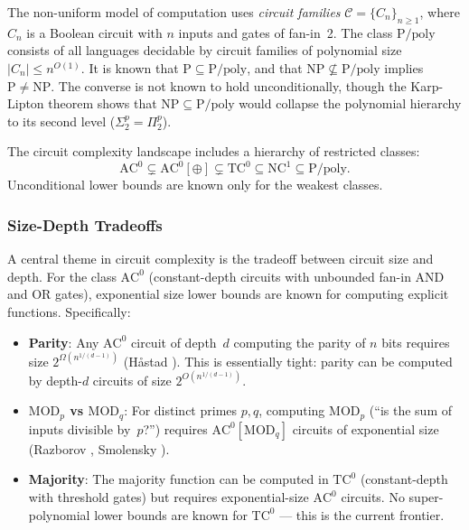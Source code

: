 \documentclass[11pt]{article}
\theoremstyle{definition}
\theoremstyle{remark}
\newcommand{\calC}{\mathcal{C}}
\newcommand{\Ppoly}{\mathrm{P/poly}}
\newcommand{\ACz}{\mathrm{AC}^0}
\newcommand{\NCone}{\mathrm{NC}^1}
\newcommand{\TCz}{\mathrm{TC}^0}
\begin{document}
The non-uniform model of computation uses \emph{circuit families}
$\calC = \{C_n\}_{n \geq 1}$, where $C_n$ is a Boolean circuit with
$n$ inputs and gates of fan-in~2.  The class $\Ppoly$ consists of all
languages decidable by circuit families of polynomial size $|C_n| \leq n^{O(1)}$.
It is known that $\mathrm{P} \subseteq \Ppoly$, and that
$\mathrm{NP} \not\subseteq \Ppoly$ implies $\mathrm{P} \neq \mathrm{NP}$.
The converse is not known to hold unconditionally, though the
Karp-Lipton theorem \cite{KL} shows that $\mathrm{NP} \subseteq \Ppoly$
would collapse the polynomial hierarchy to its second level
($\Sigma_2^p = \Pi_2^p$).

The circuit complexity landscape includes a hierarchy of restricted
classes:
\[
  \ACz \subsetneq \ACz[\oplus] \subsetneq \TCz \subseteq \NCone \subseteq \Ppoly.
\]
Unconditional lower bounds are known only for the weakest classes.

\subsubsection{Size-Depth Tradeoffs}

A central theme in circuit complexity is the tradeoff between circuit
size and depth.  For the class $\ACz$ (constant-depth circuits with
unbounded fan-in AND and OR gates), exponential size lower bounds
are known for computing explicit functions.  Specifically:

\begin{itemize}[nosep]
  \item \textbf{Parity}: Any $\ACz$ circuit of depth~$d$ computing the
    parity of $n$ bits requires size $2^{\Omega(n^{1/(d-1)})}$
    (H\aa stad \cite{Hastad}).  This is essentially tight: parity can be
    computed by depth-$d$ circuits of size $2^{O(n^{1/(d-1)})}$.

  \item \textbf{$\mathrm{MOD}_p$ vs $\mathrm{MOD}_q$}: For distinct primes
    $p, q$, computing $\mathrm{MOD}_p$ (``is the sum of inputs divisible
    by~$p$?'') requires $\ACz[\mathrm{MOD}_q]$ circuits of exponential
    size (Razborov \cite{Raz87}, Smolensky \cite{Smol87}).

  \item \textbf{Majority}: The majority function can be computed in $\TCz$
    (constant-depth with threshold gates) but requires exponential-size
    $\ACz$ circuits.  No super-polynomial lower bounds are known for $\TCz$
    --- this is the current frontier.
\end{itemize}
\end{document}
